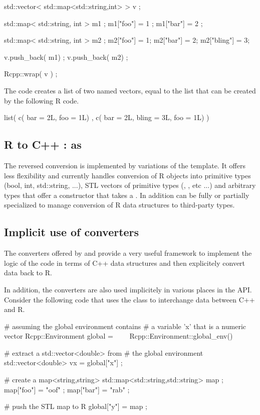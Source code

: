 \begin{example}
std::vector< std::map<std::string,int> > v ;

std::map< std::string, int > m1 ;
m1["foo"] = 1 ; m1["bar"] = 2 ;

std::map< std::string, int > m2 ;
m2["foo"] = 1; m2["bar"] = 2; m2["bling"] = 3;

v.push_back( m1) ;
v.push_back( m2) ;

Rcpp::wrap( v ) ;
\end{example}

The code creates a list of two named vectors, equal to the list that 
can be created by the following R code. 

\begin{example}
list( c( bar = 2L, foo = 1L) , 
      c( bar = 2L, bling = 3L, foo = 1L) )
\end{example}

\subsection{R to C++ : as}

The reversed conversion is implemented by variations of the 
 template. It offers less flexibility and currently
handles conversion of R objects into primitive types (bool, int, std::string, ...), 
STL vectors of primitive types  (, 
, etc ...) and arbitrary types that offer 
a constructor that takes a . In addition  can 
be fully or partially specialized to manage conversion of R data 
structures to third-party types.

\subsection{Implicit use of converters}

The converters offered by  and  provide a very 
useful framework to implement the logic of the code in terms of C++ 
data structures and then explicitely convert data back to R. 

In addition, the converters are also used implicitely
in various places in the  API. 
Consider the following code that uses the  class to 
interchange data between C++ and R.

\begin{example}
# assuming the global environment contains 
# a variable 'x' that is a numeric vector
Rcpp::Environment global = 
\ \ \ \ Rcpp::Environment::global_env()

# extract a std::vector<double> from 
# the global environment
std::vector<double> vx = global["x"] ;

# create a map<string,string>
std::map<std::string,std::string> map ;
map["foo"] = "oof" ;
map["bar"] = "rab" ;

# push the STL map to R
global["y"] = map ;
\end{example}

